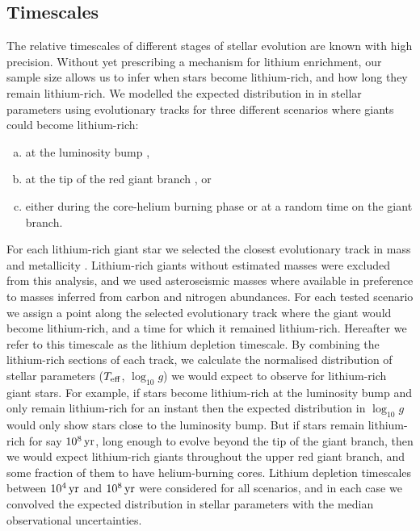\documentclass[twocolumn]{aastex62}
\begin{document}
\subsection{Timescales}

The relative timescales of different stages of stellar evolution are known with
high precision. Without yet prescribing a mechanism for lithium 
enrichment, our sample size allows us to infer when stars become lithium-rich,
and how long they remain lithium-rich. We modelled the expected distribution 
in in stellar parameters using evolutionary tracks \citep{Dotter_2016,Choi_2016}
for three different scenarios where giants could become lithium-rich:
\begin{enumerate}[(a)]
	\item at the luminosity bump \citep[e.g.,][]{Charbonnel_2000},
	\item at the tip of the red giant branch \citep[e.g.,][]{Lattanzio_2014}, or
	\item either during the core-helium burning phase or at a random time on the giant branch.
\end{enumerate} 


For each lithium-rich giant star we selected the closest evolutionary track in 
mass and metallicity \citep{Dotter_2016,Choi_2016}. Lithium-rich giants without 
estimated masses were excluded from this analysis, and we used asteroseismic masses 
where available in preference to masses inferred from carbon and nitrogen abundances. 
For each tested scenario we assign a point along the selected evolutionary track 
where the giant would become lithium-rich, and a time for which it remained 
lithium-rich. Hereafter we refer to this timescale as the lithium depletion timescale. 
By combining the lithium-rich sections of each track, we calculate the normalised distribution 
of stellar parameters ($T_{\rm eff}$, $\log_{10}{g}$) we would expect to 
observe for lithium-rich giant stars. For example, if stars become lithium-rich 
at the luminosity bump and only remain lithium-rich for an instant then the expected
distribution in $\log_{10}{g}$ would only show stars close to the luminosity bump.
But if stars remain lithium-rich for say $10^8\,{\rm yr}$, long enough to evolve 
beyond the tip of the giant branch, then we would expect lithium-rich giants 
throughout the upper red giant branch, and some fraction of them to have
helium-burning cores.
Lithium depletion timescales between $10^4\,{\rm yr}$ and $10^8\,{\rm yr}$ were 
considered for all scenarios, and in each case we convolved the expected distribution in stellar 
parameters with the median observational uncertainties. 
\end{document}
